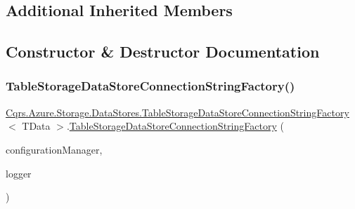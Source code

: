 \subsection*{Additional Inherited Members}


\subsection{Constructor \& Destructor Documentation}
\mbox{\label{classCqrs_1_1Azure_1_1Storage_1_1DataStores_1_1TableStorageDataStoreConnectionStringFactory_a72218c0219be3c3185ae98893f0d91e3}} 
\subsubsection{\texorpdfstring{Table\+Storage\+Data\+Store\+Connection\+String\+Factory()}{TableStorageDataStoreConnectionStringFactory()}}
{\footnotesize\ttfamily \hyperlink{classCqrs_1_1Azure_1_1Storage_1_1DataStores_1_1TableStorageDataStoreConnectionStringFactory}{Cqrs.\+Azure.\+Storage.\+Data\+Stores.\+Table\+Storage\+Data\+Store\+Connection\+String\+Factory}$<$ T\+Data $>$.\hyperlink{classCqrs_1_1Azure_1_1Storage_1_1DataStores_1_1TableStorageDataStoreConnectionStringFactory}{Table\+Storage\+Data\+Store\+Connection\+String\+Factory} (\begin{DoxyParamCaption}\item[{\hyperlink{interfaceCqrs_1_1Configuration_1_1IConfigurationManager}{I\+Configuration\+Manager}}]{configuration\+Manager,  }\item[{I\+Logger}]{logger }\end{DoxyParamCaption})}



